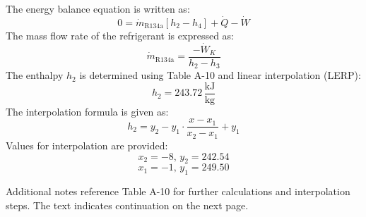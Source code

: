 The energy balance equation is written as:  
\[
0 = \dot{m}_{\text{R134a}} \left[ h_2 - h_4 \right] + \dot{Q} - \dot{W}
\]  
The mass flow rate of the refrigerant is expressed as:  
\[
\dot{m}_{\text{R134a}} = \frac{-\dot{W}_K}{h_2 - h_3}
\]  
The enthalpy \( h_2 \) is determined using Table A-10 and linear interpolation (LERP):  
\[
h_2 = 243.72 \, \frac{\text{kJ}}{\text{kg}}
\]  
The interpolation formula is given as:  
\[
h_2 = y_2 - y_1 \cdot \frac{x - x_1}{x_2 - x_1} + y_1
\]  
Values for interpolation are provided:  
\[
x_2 = -8, \, y_2 = 242.54  
\]  
\[
x_1 = -1, \, y_1 = 249.50  
\]  

Additional notes reference Table A-10 for further calculations and interpolation steps. The text indicates continuation on the next page.
